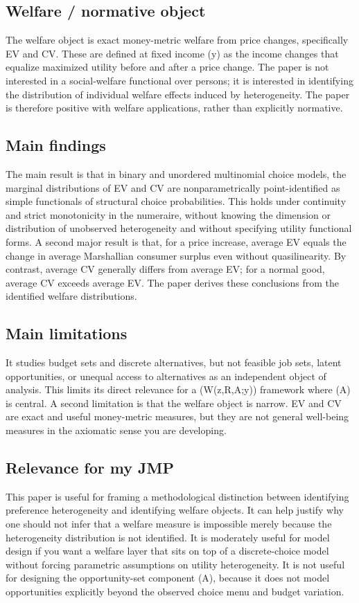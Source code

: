 \documentclass[11pt,a4paper]{article}
\begin{document}
\subsection*{Welfare / normative object}
The welfare object is exact money-metric welfare from price changes, specifically EV and CV. These are defined at fixed income (y) as the income changes that equalize maximized utility before and after a price change. The paper is not interested in a social-welfare functional over persons; it is interested in identifying the distribution of individual welfare effects induced by heterogeneity. The paper is therefore positive with welfare applications, rather than explicitly normative.

\subsection*{Main findings}
The main result is that in binary and unordered multinomial choice models, the marginal distributions of EV and CV are nonparametrically point-identified as simple functionals of structural choice probabilities. This holds under continuity and strict monotonicity in the numeraire, without knowing the dimension or distribution of unobserved heterogeneity and without specifying utility functional forms. A second major result is that, for a price increase, average EV equals the change in average Marshallian consumer surplus even without quasilinearity. By contrast, average CV generally differs from average EV; for a normal good, average CV exceeds average EV. The paper derives these conclusions from the identified welfare distributions.

\subsection*{Main limitations}
It studies budget sets and discrete alternatives, but not feasible job sets, latent opportunities, or unequal access to alternatives as an independent object of analysis. This limits its direct relevance for a (W(z,R,A;y)) framework where (A) is central. A second limitation is that the welfare object is narrow. EV and CV are exact and useful money-metric measures, but they are not general well-being measures in the axiomatic sense you are developing.

\subsection*{Relevance for my JMP}
This paper is useful for framing a methodological distinction between identifying preference heterogeneity and identifying welfare objects. It can help justify why one should not infer that a welfare measure is impossible merely because the heterogeneity distribution is not identified. It is moderately useful for model design if you want a welfare layer that sits on top of a discrete-choice model without forcing parametric assumptions on utility heterogeneity. It is not useful for designing the opportunity-set component (A), because it does not model opportunities explicitly beyond the observed choice menu and budget variation.
\end{document}
